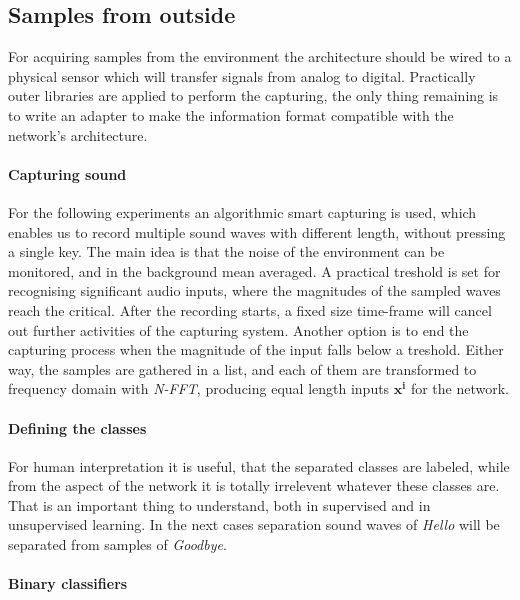 \subsection{Samples from outside}
For acquiring samples from the environment the architecture should be wired to a physical sensor which will transfer signals from analog to digital. 
Practically outer libraries are applied to perform the capturing, the only thing remaining is to write an adapter to make the information format compatible with the network's architecture.

\paragraph{Capturing sound}
For the following experiments an algorithmic smart capturing is used, which enables us to record multiple sound waves with different length, without pressing a single key. The main idea is that the noise of the environment can be monitored, and in the background mean averaged. A practical treshold is set for recognising significant audio inputs, where the magnitudes of the sampled waves reach the critical. After the recording starts, a fixed size time-frame will cancel out further activities of the capturing system. Another option is to end the capturing process when the magnitude of the input falls below a treshold. Either way, the samples are gathered in a list, and each of them are transformed to frequency domain with \emph{N-FFT}, producing equal length inputs  $\mathbf{x^i}$ for the network.

\paragraph{Defining the classes}
For human interpretation it is useful, that the separated classes are labeled, while from the aspect of the network it is totally irrelevent whatever these classes are. That is an important thing to understand, both in supervised and in unsupervised learning. In the next cases separation sound waves of \emph{Hello} will be separated from samples of \emph{Goodbye}.

\paragraph{Binary classifiers}
